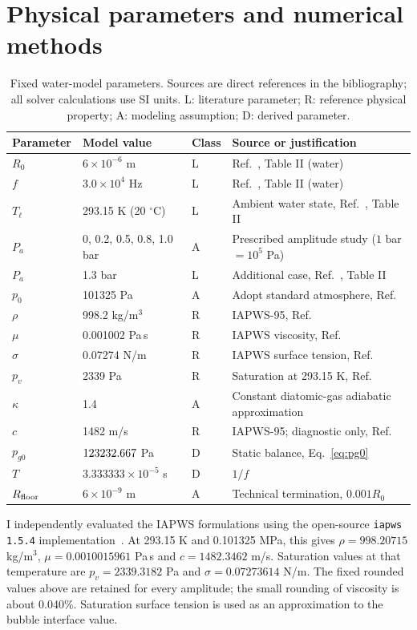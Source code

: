 \documentclass[10pt,a4paper]{article}
\begin{document}
\newpage
\section{Physical parameters and numerical methods}
\begin{table}[H]
\centering\small
\caption{Fixed water-model parameters. Sources are direct references in the bibliography; all solver calculations use SI units. L: literature parameter; R: reference physical property; A: modeling assumption; D: derived parameter.}
\begin{tabular}{llll}
\toprule
Parameter & Model value & Class & Source or justification\\\midrule
$R_0$ & $6\times10^{-6}$ m & L & Ref.~\cite{sadighi}, Table II (water)\\
$f$ & $3.0\times10^4$ Hz & L & Ref.~\cite{sadighi}, Table II (water)\\
$T_{\ell}$ & 293.15 K (20 $^\circ$C) & L & Ambient water state, Ref.~\cite{sadighi}, Table II\\
$P_a$ & 0, 0.2, 0.5, 0.8, 1.0 bar & A & Prescribed amplitude study ($1$ bar $=10^5$ Pa)\\
$P_a$ & 1.3 bar & L & Additional case, Ref.~\cite{sadighi}, Table II\\
$p_0$ & 101325 Pa & A & Adopt standard atmosphere, Ref.~\cite{atm}\\
$\rho$ & 998.2 kg/m$^3$ & R & IAPWS-95, Ref.~\cite{iapws95}\\
$\mu$ & 0.001002 Pa\,s & R & IAPWS viscosity, Ref.~\cite{viscosity}\\
$\sigma$ & 0.07274 N/m & R & IAPWS surface tension, Ref.~\cite{surface}\\
$p_v$ & 2339 Pa & R & Saturation at 293.15 K, Ref.~\cite{iapws95}\\
$\kappa$ & 1.4 & A & Constant diatomic-gas adiabatic approximation\\
$c$ & 1482 m/s & R & IAPWS-95; diagnostic only, Ref.~\cite{iapws95}\\
$p_{g0}$ & $123232.667$ Pa & D & Static balance, Eq.~\eqref{eq:pg0}\\
$T$ & $3.333333\times10^{-5}$ s & D & $1/f$\\
$R_{\rm floor}$ & $6\times10^{-9}$ m & A & Technical termination, $0.001R_0$\\\bottomrule
\end{tabular}
\end{table}

I independently evaluated the IAPWS formulations using the open-source \texttt{iapws 1.5.4} implementation~\cite{implementation}. At 293.15 K and 0.101325 MPa, this gives $\rho=998.20715$ kg/m$^3$, $\mu=0.0010015961$ Pa\,s and $c=1482.3462$ m/s. Saturation values at that temperature are $p_v=2339.3182$ Pa and $\sigma=0.07273614$ N/m. The fixed rounded values above are retained for every amplitude; the small rounding of viscosity is about 0.040\%. Saturation surface tension is used as an approximation to the bubble interface value.
\end{document}
